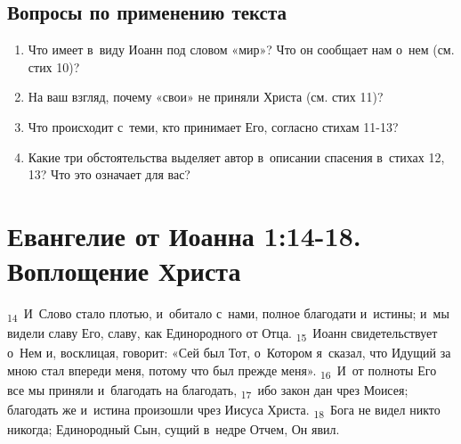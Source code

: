 \documentclass[a4paper,12pt]{article}
\begin{document}
\subsection*{Вопросы по применению текста} 
\begin{enumerate}
    \item Что имеет в~виду Иоанн под словом «мир»? Что он сообщает нам о~нем (см. стих 10)? 
    
    \myline
    
    \myline

    \item На ваш взгляд, почему «свои» не приняли Христа (см. стих 11)? 
    
    \myline
    
    \myline

    \item Что происходит с~теми, кто принимает Его, согласно стихам 11-13? 
    
    \myline
    
    \myline

    \item Какие три обстоятельства выделяет автор в~описании спасения в~стихах 12, 13? Что это означает для вас?
    
    \myline
    
    \myline

\end{enumerate}



\section{Евангелие от Иоанна 1:14-18. Воплощение Христа}

\textsubscript{14}~И~Слово стало плотью, и~обитало с~нами, полное благодати и~истины; и~мы видели славу Его, славу, как Единородного от Отца. \textsubscript{15}~Иоанн свидетельствует о~Нем и, восклицая, говорит: «Сей был Тот, о~Котором я~сказал, что Идущий за мною стал впереди меня, потому что был прежде меня». \textsubscript{16}~И~от полноты Его все мы приняли и~благодать на благодать, \textsubscript{17}~ибо закон дан чрез Моисея; благодать же и~истина произошли чрез Иисуса Христа. \textsubscript{18}~Бога не видел никто никогда; Единородный Сын, сущий в~недре Отчем, Он явил.
\end{document}
